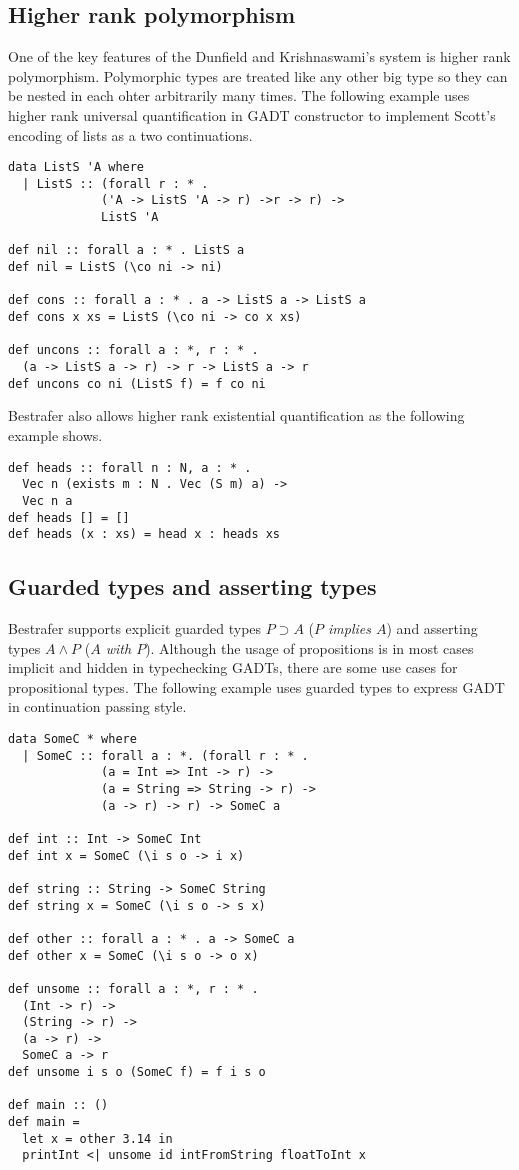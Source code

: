 \documentclass[declaration,shortabstract,english]{iithesis}
\begin{document}
\subsection*{Higher rank polymorphism}
One of the key features of the Dunfield and Krishnaswami's system is higher rank polymorphism.
Polymorphic types are treated like any other big type so they can be nested in each ohter arbitrarily
many times. The following example uses higher rank universal quantification in GADT constructor
to implement Scott's encoding of lists as a two continuations\cite{rankNtypes}.
\begin{verbatim}
data ListS 'A where
  | ListS :: (forall r : * .
             ('A -> ListS 'A -> r) ->r -> r) ->
             ListS 'A

def nil :: forall a : * . ListS a
def nil = ListS (\co ni -> ni)

def cons :: forall a : * . a -> ListS a -> ListS a
def cons x xs = ListS (\co ni -> co x xs)

def uncons :: forall a : *, r : * .
  (a -> ListS a -> r) -> r -> ListS a -> r
def uncons co ni (ListS f) = f co ni
\end{verbatim}
Bestrafer also allows higher rank existential quantification as the following example shows.
\begin{verbatim}
def heads :: forall n : N, a : * .
  Vec n (exists m : N . Vec (S m) a) ->
  Vec n a
def heads [] = []
def heads (x : xs) = head x : heads xs
\end{verbatim}

\subsection*{Guarded types and asserting types}
Bestrafer supports explicit guarded types $P \supset A $ (\textit{$P$ implies $A$})
and asserting types $A \wedge  P$ (\textit{$A$ with $P$}).
Although the usage of propositions is in most cases implicit and hidden in typechecking GADTs,
there are some use cases for propositional types.
The following example uses guarded types to express GADT in continuation passing style\cite{rankNtypes}.

\begin{verbatim}
data SomeC * where
  | SomeC :: forall a : *. (forall r : * .
             (a = Int => Int -> r) ->
             (a = String => String -> r) ->
             (a -> r) -> r) -> SomeC a

def int :: Int -> SomeC Int
def int x = SomeC (\i s o -> i x)

def string :: String -> SomeC String
def string x = SomeC (\i s o -> s x)

def other :: forall a : * . a -> SomeC a
def other x = SomeC (\i s o -> o x)

def unsome :: forall a : *, r : * .
  (Int -> r) ->
  (String -> r) ->
  (a -> r) ->
  SomeC a -> r
def unsome i s o (SomeC f) = f i s o

def main :: ()
def main =
  let x = other 3.14 in
  printInt <| unsome id intFromString floatToInt x
\end{verbatim}
\end{document}
